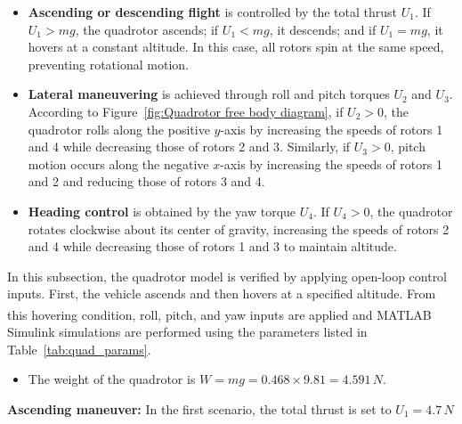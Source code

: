 \begin{itemize}
  \item \textbf{Ascending or descending flight} is controlled by the total thrust $U_1$. 
  If $U_1 > mg$, the quadrotor ascends; if $U_1 < mg$, it descends; and if $U_1 = mg$, 
  it hovers at a constant altitude. In this case, all rotors spin at the same speed, 
  preventing rotational motion.

  \item \textbf{Lateral maneuvering} is achieved through roll and pitch torques 
  $U_2$ and $U_3$. According to Figure~\ref{fig:Quadrotor free body diagram}, if $U_2>0$, 
  the quadrotor rolls along the positive $y$-axis by increasing the speeds of rotors 1 
  and 4 while decreasing those of rotors 2 and 3. Similarly, if $U_3>0$, pitch motion 
  occurs along the negative $x$-axis by increasing the speeds of rotors 1 and 2 and 
  reducing those of rotors 3 and 4.

  \item \textbf{Heading control} is obtained by the yaw torque $U_4$. If $U_4>0$, the 
  quadrotor rotates clockwise about its center of gravity, increasing the speeds of 
  rotors 2 and 4 while decreasing those of rotors 1 and 3 to maintain altitude.
\end{itemize}

In this subsection, the quadrotor model is verified by applying open-loop control inputs. 
First, the vehicle ascends and then hovers at a specified altitude. From this hovering 
condition, roll, pitch, and yaw inputs are applied and MATLAB\textsuperscript{\textregistered} 
Simulink simulations are performed using the parameters listed in Table~\ref{tab:quad_params}.

\begin{itemize}
  \item The weight of the quadrotor is 
  $W = mg = 0.468 \times 9.81 = 4.591\,N$.
\end{itemize}


\textbf{Ascending maneuver:} In the first scenario, the total thrust is set to 
$U_1 = 4.7\,N$ 


